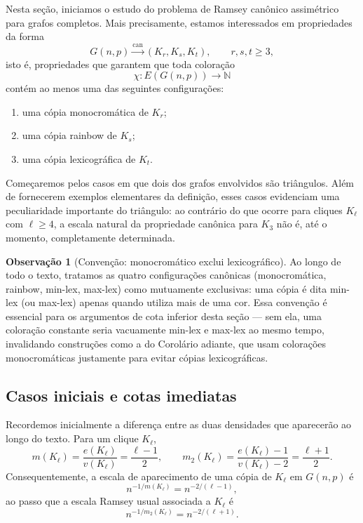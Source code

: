 \documentclass[reqno, 12pt]{amsart}
\numberwithin{equation}{section}
\theoremstyle{plain}
\theoremstyle{definition}
\newtheorem{remark}[theorem]{Observação}
\begin{document}
Nesta seção, iniciamos o estudo do problema de Ramsey canônico
assimétrico para grafos completos. Mais precisamente, estamos
interessados em propriedades da forma
\[
  G(n,p)
  \xrightarrow{\mathrm{can}}
  (K_r,K_s,K_t),
  \qquad r,s,t\geq3,
\]
isto é, propriedades que garantem que toda coloração
\[
  \chi:E(G(n,p))\longrightarrow \mathbb{N}
\]
contém ao menos uma das seguintes configurações:
\begin{enumerate}
  \item uma cópia monocromática de $K_r$;
  \item uma cópia rainbow de $K_s$;
  \item uma cópia lexicográfica de $K_t$.
\end{enumerate}

Começaremos pelos casos em que dois dos grafos envolvidos são
triângulos. Além de fornecerem exemplos elementares da definição,
esses casos evidenciam uma peculiaridade importante do triângulo:
ao contrário do que ocorre para cliques $K_\ell$ com $\ell\geq4$,
a escala natural da propriedade canônica para $K_3$ não é, até o
momento, completamente determinada.

\begin{remark}[Convenção: monocromático exclui lexicográfico]
  \label{rem:convencao-mono-lex}
  Ao longo de todo o texto, tratamos as quatro configurações
  canônicas (monocromática, rainbow, min-lex, max-lex) como
  mutuamente exclusivas: uma cópia é dita min-lex (ou max-lex)
  apenas quando utiliza mais de uma cor. Essa convenção é essencial
  para os argumentos de cota inferior desta seção — sem ela, uma
  coloração constante seria vacuamente min-lex e max-lex ao mesmo
  tempo, invalidando construções como a do Corolário adiante, que
  usam colorações monocromáticas justamente para evitar cópias
  lexicográficas.
\end{remark}

\subsection{Casos iniciais e cotas imediatas}

Recordemos inicialmente a diferença entre as duas densidades que
aparecerão ao longo do texto. Para um clique $K_\ell$,
\[
  m(K_\ell)
  =
  \frac{e(K_\ell)}{v(K_\ell)}
  =
  \frac{\ell-1}{2},
  \qquad
  m_2(K_\ell)
  =
  \frac{e(K_\ell)-1}{v(K_\ell)-2}
  =
  \frac{\ell+1}{2}.
\]
Consequentemente, a escala de aparecimento de uma cópia de
$K_\ell$ em $G(n,p)$ é
\[
  n^{-1/m(K_\ell)}
  =
  n^{-2/(\ell-1)},
\]
ao passo que a escala Ramsey usual associada a $K_\ell$ é
\[
  n^{-1/m_2(K_\ell)}
  =
  n^{-2/(\ell+1)}.
\]
\end{document}
